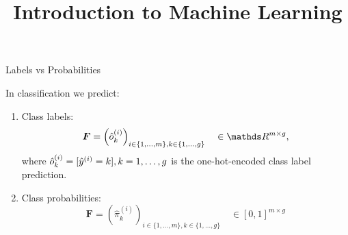 \documentclass[11pt,compress,t,notes=noshow, xcolor=table]{beamer}
\title{Introduction to Machine Learning}
\begin{document}


\begin{vbframe}{Labels vs Probabilities}

\footnotesize

In classification we predict:

\begin{enumerate}
  \item Class labels: \\
  $$\bm{F} = \left( \hat{o}_k^{(i)} \right)_{i \in \{1, \dots, m\}, 
  k \in \{1, \dots, g\}}
  \quad \in \R^{m \times g},$$
  where $\hat{o}_k^{(i)} = [\hat{y}^{(i)} = k], k = 1, \dots, g$ is the one-hot-encoded 
  class label prediction.
  \item Class probabilities: \\
  $$\bm{F} = \left(\hat{\pi}_k^{(i)} \right)_{i \in \{1, \dots, m\}, 
  k \in \{1, \dots, g\}}
  \quad \in [0, 1]^{m \times g}$$
\end{enumerate}


\end{vbframe}
\end{document}
